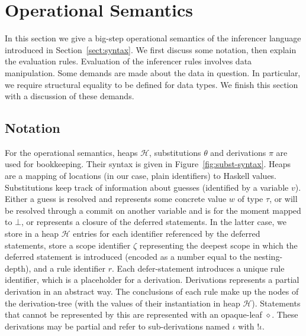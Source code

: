 \documentclass[preprint,natbib]{sigplanconf}
\newcommand\Heap{\mathcal{H}}
\newcommand\Substitution{\theta}
\newcommand\Scope{\zeta}
\newcommand\Deriv{\pi}
\newcommand\RuleIdent{\iota}
\newcommand\derivref[1]{!#1}
\begin{document}
\section{Operational Semantics}
\label{sect:operational-semantics}


In this section we give a big-step operational semantics of the inferencer language introduced in Section~\ref{sect:syntax}.
We first discuss some notation, then explain the evaluation rules. Evaluation of the inferencer rules involves data manipulation.
Some demands are made about the data in question. In particular, we require structural equality to be defined for data types.
We finish this section with a discussion of these demands.

  \subsection{Notation}

    For the operational semantics, heaps $\Heap$, substitutions $\Substitution$ and derivations $\Deriv$ are used for
    bookkeeping. Their syntax is given in Figure~\ref{fig:subst-syntax}. Heaps are a mapping of locations (in our case, plain identifiers) to Haskell values.
    Substitutions keep track of information about guesses (identified by a variable $v$). Either a guess is resolved and represents
    some concrete value $w$ of type $\tau$, or will be resolved through a commit on another variable and is for the moment mapped
    to $\bot$, or represents a closure of the deferred statements. In the latter case, we store in a heap $\Heap$ entries for each
    identifier referenced by the deferred statements, store a scope identifier $\Scope$ representing the deepest scope in which the
    deferred statement is introduced (encoded as a number equal to the nesting-depth), and a rule identifier $r$. Each defer-statement
    introduces a unique rule identifier, which is
    a placeholder for a derivation. Derivations represents a partial derivation in an abstract way. The conclusions of each rule make
    up the nodes of the derivation-tree (with the values of their instantiation in heap $\Heap$). Statements that cannot be represented
    by this are represented with an opaque-leaf $\diamond$. These derivations may be partial and refer to sub-derivations named
    $\RuleIdent$ with $\derivref{\RuleIdent}$.
\end{document}
